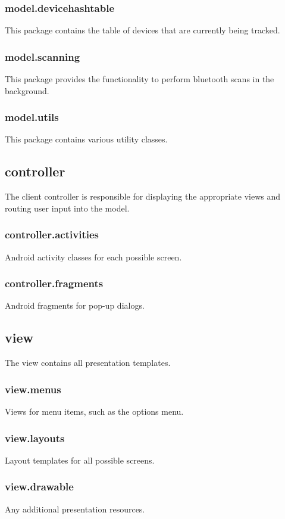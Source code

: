 \subsubsection{model.devicehashtable}
This package contains the table of devices that are currently being tracked.
\subsubsection{model.scanning}
This package provides the functionality to perform bluetooth scans in the background.
\subsubsection{model.utils}
This package contains various utility classes.
\subsection{controller}
The client controller is responsible for displaying the appropriate views and routing user input into the model.
\subsubsection{controller.activities}
Android activity classes for each possible screen.
\subsubsection{controller.fragments}
Android fragments for pop-up dialogs.
\subsection{view}
The view contains all presentation templates. 
\subsubsection{view.menus}
Views for menu items, such as the options menu.
\subsubsection{view.layouts}
Layout templates for all possible screens. 
\subsubsection{view.drawable}
Any additional presentation resources.



